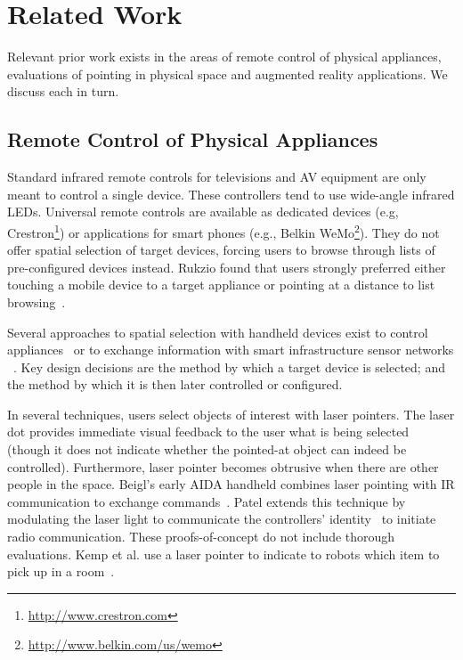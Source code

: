 \section{Related Work}
Relevant prior work exists in the areas of remote control of physical appliances, evaluations of pointing in physical space and augmented reality applications. We discuss each in turn.

\subsection{Remote Control of Physical Appliances}
Standard infrared remote controls for televisions and AV equipment are only meant to control a single device. These controllers tend to use wide-angle infrared LEDs. Universal remote controls are available as dedicated devices (e.g, Crestron\footnote{\url{http://www.crestron.com}}) or applications for smart phones (e.g., Belkin WeMo\footnote{\url{http://www.belkin.com/us/wemo}}). They do not offer spatial selection of target devices, forcing users to browse through lists of pre-configured devices instead. Rukzio found that users strongly preferred either touching a mobile device to a target appliance or pointing at a distance to list browsing~\cite{rukzio_experimental_2006}.

Several approaches to spatial selection with handheld devices exist to control appliances~\cite{beigl_point_1999,patel_2-way_2003,wilson_xwand:_2003,schmidt_picontrol:_2012} or to exchange information with smart infrastructure sensor networks ~\cite{lifton_tricorder:_2007,mittal_ubicorder:_2011,costanza_sensortune:_2010}. Key design decisions are the method by which a target device is selected; and the method by which it is then later controlled or configured.

In several techniques, users select objects of interest with laser pointers. The laser dot provides immediate visual feedback to the user what is being selected (though it does not indicate whether the pointed-at object can indeed be controlled). Furthermore, laser pointer becomes obtrusive when there are other people in the space. Beigl's early AIDA handheld combines laser pointing with IR communication to exchange commands~\cite{beigl_point_1999}. Patel extends this technique by modulating the laser light to communicate the controllers' identity~\cite{patel_2-way_2003} to initiate radio communication. These proofs-of-concept do not include thorough evaluations. Kemp et al. use a laser pointer to indicate to robots which item to pick up in a room~\cite{kemp_point-and-click_2008}. 

